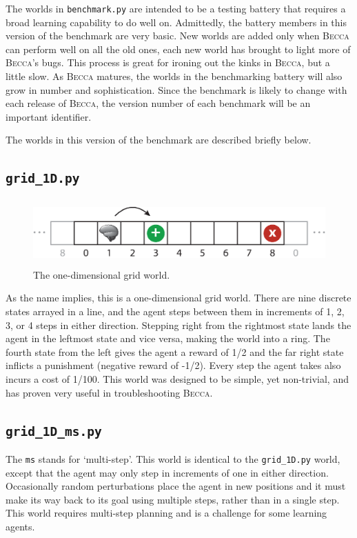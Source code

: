 The worlds in \texttt{benchmark.py} are intended to be a testing battery that requires a broad learning capability to do well on. Admittedly, the battery members in this version of the benchmark are very basic. New worlds are added only when \textsc{Becca} can perform well on all the old ones, each new world has brought to light more of \textsc{Becca}'s bugs. This process is great for ironing out the kinks in \textsc{Becca}, but a little slow. As \textsc{Becca} matures, the worlds in the benchmarking battery will also grow in number and sophistication. Since the benchmark is likely to change with each release of \textsc{Becca}, the version number of each benchmark will be an important identifier.

The worlds in this version of the benchmark are described briefly below.

\subsection{\texttt{grid\_1D.py}}

\begin{figure}
\centering
\includegraphics[height=2.5cm]{figs/grid_world_1D.eps}
\caption{The one-dimensional grid world.}
\label{grid_1D}
\end{figure}

As the name implies, this is a one-dimensional grid world. There are nine discrete states arrayed in a line, and the agent steps between them in increments of 1, 2, 3, or 4 steps in either direction. Stepping right from the rightmost state lands the agent in the leftmost state and vice versa, making the world into a ring. The fourth state from the left gives the agent a reward of 1/2 and the far right state inflicts a punishment (negative reward of -1/2). Every step the agent takes also incurs a cost of  1/100. This world was designed to be simple, yet non-trivial, and has proven very useful in troubleshooting \textsc{Becca}.

\subsection{\texttt{grid\_1D\_ms.py}}

The \texttt{ms} stands for `multi-step'. This world is identical to the \texttt{grid\_1D.py} world, except that the agent may only step in increments of one in either direction. Occasionally random perturbations place the agent in new positions and it must make its way back to its goal using multiple steps, rather than in a single step. This world requires multi-step planning and is a challenge for some learning agents.

